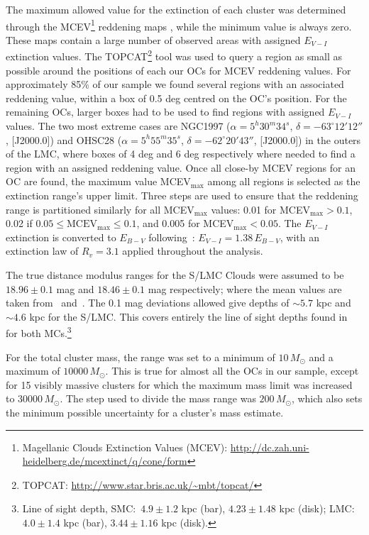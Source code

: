 \documentclass[a4paper,fleqn,usenatbib]{mnras}
\begin{document}
The maximum allowed value for the extinction of each cluster was determined
through the MCEV\footnote{Magellanic Clouds Extinction Values (MCEV):
\url{http://dc.zah.uni-heidelberg.de/mcextinct/q/cone/form}} reddening maps
\citep{Haschke_2011}, while the minimum value is always zero.
%
These maps contain a large number of observed areas with assigned $E_{V-I}$
extinction values.
The TOPCAT\footnote{TOPCAT\@: \url{http://www.star.bris.ac.uk/~mbt/topcat/}}
tool
was used to query a region as small as possible around the positions of each our
OCs for MCEV reddening values.
For approximately 85\% of our sample we found several
regions with an associated reddening value, within a box of 0.5 deg centred on
the OC's position.
For the remaining OCs, larger boxes had to be used to find regions with assigned
$E_{V-I}$ values. The two most extreme cases are NGC1997
($\alpha{=}5^h30^m34^s$, $\delta{=}-63^\circ12'12''$, [J2000.0]) and OHSC28
($\alpha{=}5^h55^m35^s$, $\delta{=}-62^\circ20'43''$, [J2000.0]) in the outers
of the LMC, where boxes of 4 deg and 6 deg respectively where needed to find a
region with an assigned reddening value.
%
Once all close-by MCEV regions for an OC are found, the maximum value
MCEV$_{\max}$ among all regions is selected as the extinction range's upper
limit. Three steps are used to ensure that the reddening range is partitioned
similarly for all MCEV$_{\max}$ values: 0.01 for MCEV$_{\max}>0.1$, 0.02 if
$0.05\leq \mathrm{MCEV}_{\max}\leq0.1$, and 0.005 for MCEV$_{\max}<0.05$.
%
The $E_{V-I}$ extinction is converted to $E_{B-V}$
following~\cite{Tammann_2003}: $E_{V-I}{=}1.38\,E_{B-V}$, with an extinction
law of $R_v{=}3.1$ applied throughout the analysis.

The true distance modulus ranges for the S/LMC Clouds were assumed to be
$18.96\pm0.1$ mag and $18.46\pm0.1$ mag respectively; where the mean values
are taken from~\cite{de_Grijs_2015} and~\cite{de_Grijs_2014}.
%
The 0.1 mag deviations allowed give depths of $\sim5.7$ kpc and
$\sim4.6$ kpc for the S/LMC\@. This covers entirely the line of sight
depths found in~\cite{Subramanian_2009} for both MCs.\footnote{Line of sight
depth, SMC:\ $4.9\pm1.2$ kpc (bar), $4.23\pm1.48$ kpc (disk); LMC:\
$4.0\pm1.4$ kpc (bar), $3.44\pm1.16$ kpc (disk).}

For the total cluster mass, the range was set to a minimum of
$10\,M_ {\odot}$ and a maximum of $10000\,M_{\odot}$. This is true for almost
all the OCs in our sample, except for 15 visibly massive clusters for
which the maximum mass limit was increased to $30000\,M_{\odot}$.
The step used to divide the mass range was $200\,M_{\odot}$, which also sets the
minimum possible uncertainty for a cluster's mass estimate.
\end{document}
